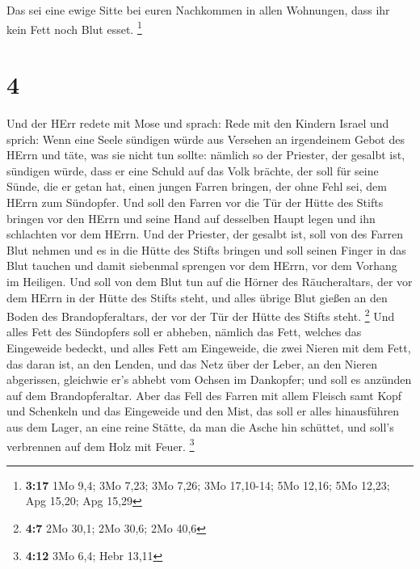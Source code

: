  Das sei eine ewige Sitte bei euren Nachkommen in allen
Wohnungen, dass ihr kein Fett noch Blut esset. \footnote{\textbf{3:17}
  1Mo 9,4; 3Mo 7,23; 3Mo 7,26; 3Mo 17,10-14; 5Mo 12,16; 5Mo 12,23; Apg
  15,20; Apg 15,29}

\hypertarget{section-1}{%
\section{4}\label{section-1}}

 Und der HErr redete mit Mose und sprach:  Rede
mit den Kindern Israel und sprich: Wenn eine Seele sündigen würde aus
Versehen an irgendeinem Gebot des HErrn und täte, was sie nicht tun
sollte:  nämlich so der Priester, der gesalbt ist, sündigen
würde, dass er eine Schuld auf das Volk brächte, der soll für seine
Sünde, die er getan hat, einen jungen Farren bringen, der ohne Fehl sei,
dem HErrn zum Sündopfer.  Und soll den Farren vor die Tür
der Hütte des Stifts bringen vor den HErrn und seine Hand auf desselben
Haupt legen und ihn schlachten vor dem HErrn.  Und der
Priester, der gesalbt ist, soll von des Farren Blut nehmen und es in die
Hütte des Stifts bringen  und soll seinen Finger in das Blut
tauchen und damit siebenmal sprengen vor dem HErrn, vor dem Vorhang im
Heiligen.  Und soll von dem Blut tun auf die Hörner des
Räucheraltars, der vor dem HErrn in der Hütte des Stifts steht, und
alles übrige Blut gießen an den Boden des Brandopferaltars, der vor der
Tür der Hütte des Stifts steht. \footnote{\textbf{4:7} 2Mo 30,1; 2Mo
  30,6; 2Mo 40,6}  Und alles Fett des Sündopfers soll er
abheben, nämlich das Fett, welches das Eingeweide bedeckt, und alles
Fett am Eingeweide,  die zwei Nieren mit dem Fett, das daran
ist, an den Lenden, und das Netz über der Leber, an den Nieren
abgerissen,  gleichwie er's abhebt vom Ochsen im Dankopfer;
und soll es anzünden auf dem Brandopferaltar.  Aber das
Fell des Farren mit allem Fleisch samt Kopf und Schenkeln und das
Eingeweide und den Mist,  das soll er alles hinausführen
aus dem Lager, an eine reine Stätte, da man die Asche hin schüttet, und
soll's verbrennen auf dem Holz mit Feuer. \footnote{\textbf{4:12} 3Mo
  6,4; Hebr 13,11}


